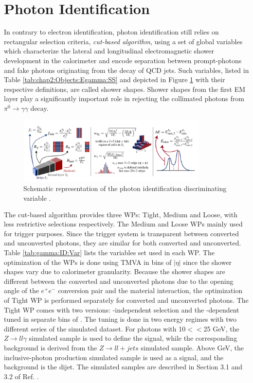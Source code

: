 \section{Photon Identification}
\label{gamma:ID}
In contrary to electron identification, photon identification still relies on rectangular selection criteria, \emph{cut-based algorithm}, using a set of global variables which characterize the lateral and longitudinal electromagnetic shower development in the calorimeter and encode separation between prompt-photons and fake photons originating from the decay of QCD jets. Such variables, listed in Table \ref{tab:chap2:Objects:Egamma:SS} and depicted in Figure \ref{fig:gamma:ID:SS} with their respective definitions, are called shower shapes. Shower shapes from the first EM layer play a significantly important role in rejecting the collimated photons from $\pi^{0} \rightarrow\gamma\gamma$ decay. \\ 
\begin{figure}[htbp]
    \centering
    \includegraphics[width=0.85\textwidth]{Ch3/Img/ShowerShapes.png}
    \caption{Schematic representation of the photon identification discriminating variable \cite{ShowerShapes_fig}.}
    \label{fig:gamma:ID:SS}
\end{figure}
The cut-based algorithm provides three WPs: Tight, Medium and Loose, with less restrictive selections respectively. The Medium and Loose WPs mainly used for trigger purposes. Since the trigger system is transparent between converted and unconverted photons, they are similar for both converted and unconverted. Table \ref{tab:gamma:ID:Var} lists the variables set used in each WP. The optimization of the WPs is done using TMVA \cite{TMVA} in bins of $|\eta|$ since the shower shapes vary due to calorimeter granularity. Because the shower shapes are different between the converted and unconverted photons due to the opening angle of the $e^+e^-$ conversion pair and the material interaction, the optimization of Tight WP is performed separately for converted and unconverted photons. The Tight WP comes with two versions: \eT-independent selection and the \eT-dependent tuned in separate bins of \eT. The tuning is done in two energy regimes with two different series of the simulated dataset. For photons with 10$<$\eT$<$25 GeV, the $Z\rightarrow ll\gamma$ simulated sample is used to define the signal, while the corresponding background is derived from the $Z\rightarrow ll+jets$ simulated sample. Above  GeV, the inclusive-photon production simulated sample is used as a signal, and the background is the dijet. The simulated samples are described in Section 3.1 and 3.2 of Ref. \cite{Egamma_Perf_2017}.   

